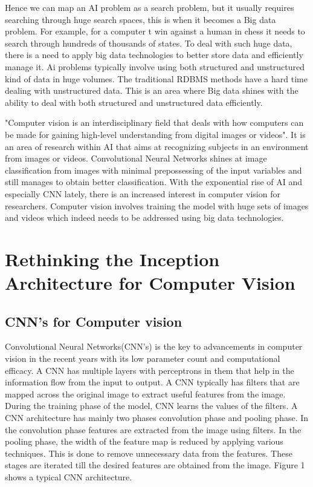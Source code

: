\documentclass[sigconf]{acmart}
\begin{document}
Hence we can map an AI problem as a search problem, but it usually requires searching through huge search spaces, this is when it becomes a Big data problem. For example, for a computer t win against a human in chess it needs to search through hundreds of thousands of states. To deal with such huge data, there is a need to apply big data technologies to better store data and efficiently manage it. Ai problems typically involve using both structured and unstructured kind of data in huge volumes. The traditional RDBMS methods have a hard time dealing with unstructured data. This is an area where Big data shines with the ability to deal with both structured and unstructured data efficiently.

"Computer vision is an interdisciplinary field that deals with how computers can be made for gaining high-level understanding from digital images or videos".\cite{wiki} It is an area of research within AI that aims at recognizing subjects in an environment from images or videos. Convolutional Neural Networks shines at image classification from images with minimal prepossessing of the input variables and still manages to obtain better classification. With the exponential rise of AI and especially CNN lately, there is an increased interest in computer vision for researchers. Computer vision involves training the model with huge sets of images and videos which indeed needs to be addressed using big data technologies.

\section{Rethinking the Inception Architecture for Computer Vision}

\subsection{CNN's for Computer vision}

Convolutional Neural Networks(CNN's) is the key to advancements in computer vision in the recent years with its low parameter count and computational efficacy. A CNN has multiple layers with perceptrons in them that help in the information flow from the input to output. A CNN typically has filters that are mapped across the original image to extract useful features from the image. During the training phase of the model, CNN learns the values of the filters. A CNN architecture has mainly two phases convolution phase and pooling phase. In the convolution phase features are extracted from the image using filters. In the pooling phase, the width of the feature map is reduced by applying various techniques. This is done to remove unnecessary data from the features. These stages are iterated till the desired features are obtained from the image.\cite{}   Figure 1 shows a typical CNN architecture.\cite{CNN figure}
\end{document}
